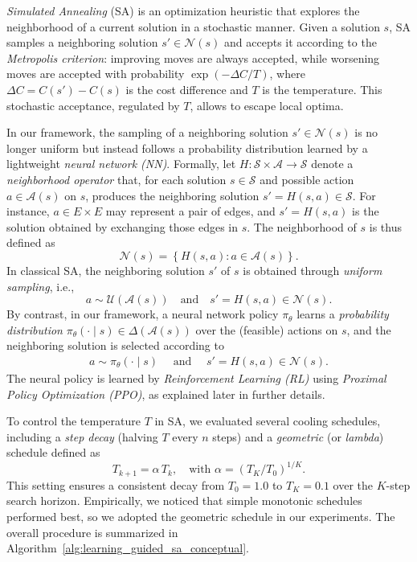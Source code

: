 \documentclass[letterpaper]{article} %
\begin{document}
\textit{Simulated Annealing} (SA) is an optimization heuristic that explores the neighborhood of a current solution in a stochastic manner. Given a solution $s$, SA samples a neighboring solution $s' \in \mathcal{N}(s)$ and accepts it according to the \textit{Metropolis criterion}: improving moves are always accepted, while worsening moves are accepted with probability $\exp(-\Delta C / T)$, where $\Delta C = C(s') - C(s)$ is the cost difference and $T$ is the temperature. This stochastic acceptance, regulated by $T$, allows to escape local optima.

In our framework, the sampling of a neighboring solution $s' \in \mathcal{N}(s)$ is no longer uniform but instead follows a probability distribution learned by a lightweight \textit{neural network (NN)}. Formally, let $H: \mathcal{S} \times \mathcal{A} \to \mathcal{S}$ denote a \textit{neighborhood operator} that, for each solution $s \in \mathcal{S}$ and possible action $a \in \mathcal{A}(s)$ on $s$, produces the neighboring solution $s' = H(s, a) \in \mathcal{S}$.
For instance, $a \in E \times E$ may represent a pair of edges, and $s' = H(s, a)$ is the solution obtained by exchanging those edges in $s$.
The neighborhood of $s$ is thus defined as
$$
\mathcal{N}(s) = \left\{ H(s, a) : a \in \mathcal{A}(s) \right\}.
$$
In classical SA, the neighboring solution $s'$ of $s$ is obtained through \textit{uniform sampling}, i.e.,
$$
a \sim \mathcal{U}(\mathcal{A}(s)) \quad \text{and} \quad s' = H(s, a) \in \mathcal{N}(s).
$$
By contrast, in our framework, a neural network policy $\pi_\theta$ learns a \textit{probability distribution} $\pi_\theta(\cdot \mid s) \in \Delta(\mathcal{A}(s))$ over the (feasible) actions on $s$, and the neighboring solution is selected according to
\begin{align*}
a \sim \pi_\theta(\cdot \mid s) \quad \text{ and } \quad s' = H(s, a) \in \mathcal{N}(s).
\end{align*}
The neural policy is learned by \textit{Reinforcement Learning (RL)} using \textit{Proximal Policy Optimization (PPO)}, as explained later in further details.

To control the temperature $T$ in SA, we evaluated several cooling schedules, including a \textit{step decay} (halving $T$ every $n$ steps) and a \textit{geometric} (or \textit{lambda}) schedule defined as
$$
T_{k+1} = \alpha \, T_k, \quad \text{with } \alpha = \left( {T_K /T_0} \right)^{1/K}.
$$
This setting ensures a consistent decay from $T_0 = 1.0$ to $T_K = 0.1$ over the $K$-step search horizon. Empirically, we noticed that simple monotonic schedules performed best, so we adopted the geometric schedule in our experiments. The overall procedure is summarized in Algorithm~\ref{alg:learning_guided_sa_conceptual}.
\end{document}
